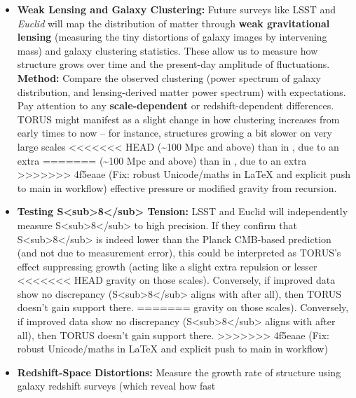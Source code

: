 \documentclass[]{article}
\begin{document}
\begin{itemize}
  \begin{itemize}
  \item
    \textbf{Weak Lensing and Galaxy Clustering:} Future surveys like
    LSST and \emph{Euclid} will map the distribution of matter through
    \textbf{weak gravitational lensing} (measuring the tiny distortions
    of galaxy images by intervening mass) and galaxy clustering
    statistics. These allow us to measure how structure grows over time
    and the present-day amplitude of fluctuations. \textbf{Method:}
    Compare the observed clustering (power spectrum of galaxy
    distribution, and lensing-derived matter power spectrum) with \LambdaCDM
    expectations. Pay attention to any \textbf{scale-dependent} or
    redshift-dependent differences. TORUS might manifest as a slight
    change in how clustering increases from early times to now -- for
    instance, structures growing a bit slower on very large scales
<<<<<<< HEAD
    (\textasciitilde100 Mpc and above) than in \LambdaCDM, due to an extra
=======
    (\textasciitilde{}100 Mpc and above) than in \LambdaCDM, due to an extra
>>>>>>> 4f5eaae (Fix: robust Unicode/maths in LaTeX and explicit push to main in workflow)
    effective pressure or modified gravity from recursion.
  \item
    \textbf{Testing
    S\textless{}sub\textgreater{}8\textless{}/sub\textgreater{}
    Tension:} LSST and Euclid will independently measure
    S\textless{}sub\textgreater{}8\textless{}/sub\textgreater{} to high
    precision. If they confirm that
    S\textless{}sub\textgreater{}8\textless{}/sub\textgreater{} is
    indeed lower than the Planck CMB-based prediction (and not due to
    measurement error), this could be interpreted as TORUS's effect
    suppressing growth (acting like a slight extra repulsion or lesser
<<<<<<< HEAD
    gravity on those scales)\hspace{0pt}. Conversely, if improved data
    show no discrepancy
    (S\textless sub\textgreater8\textless/sub\textgreater{} aligns with
    \LambdaCDM after all), then TORUS doesn't gain support there.
=======
    gravity on those scales)​. Conversely, if improved data show no
    discrepancy
    (S\textless{}sub\textgreater{}8\textless{}/sub\textgreater{} aligns
    with \LambdaCDM after all), then TORUS doesn't gain support there.
>>>>>>> 4f5eaae (Fix: robust Unicode/maths in LaTeX and explicit push to main in workflow)
  \item
    \textbf{Redshift-Space Distortions:} Measure the growth rate of
    structure using galaxy redshift surveys (which reveal how fast

\end{itemize}
\end{itemize}
\end{document}
